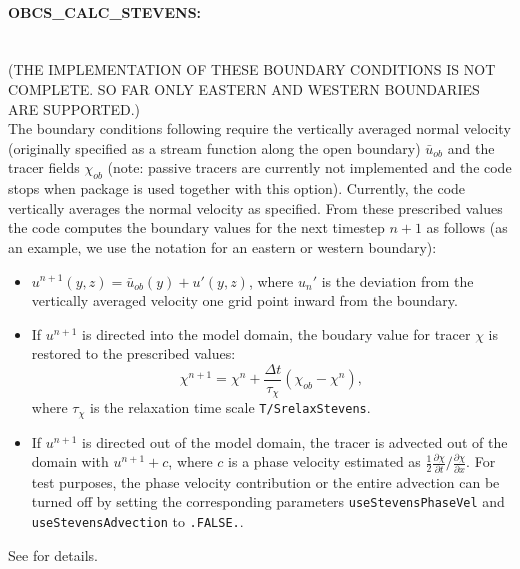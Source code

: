 \paragraph{OBCS\_CALC\_STEVENS:} ~ \\
(THE IMPLEMENTATION OF THESE BOUNDARY CONDITIONS IS NOT COMPLETE. SO
FAR ONLY EASTERN AND WESTERN BOUNDARIES ARE SUPPORTED.) \\
The boundary conditions following \citet{stevens:90} require the
vertically averaged normal velocity (originally specified as a stream
function along the open boundary) $\bar{u}_{ob}$ and the tracer fields
$\chi_{ob}$ (note: passive tracers are currently not implemented and
the code stops when package  is used together with this
option). Currently, the code vertically averages the normal velocity
as specified. From these prescribed values the code computes the
boundary values for the next timestep $n+1$ as follows (as an 
example, we use the notation for an eastern or western boundary):
\begin{itemize}
\item $u^{n+1}(y,z) = \bar{u}_{ob}(y) + u'(y,z)$, where $u_{n}'$ is the
  deviation from the vertically averaged velocity one grid point
  inward from the boundary.
\item If $u^{n+1}$ is directed into the model domain, the boudary
  value for tracer $\chi$ is restored to the prescribed values:
  \[\chi^{n+1} =   \chi^{n} + \frac{\Delta{t}}{\tau_\chi} (\chi_{ob} -
  \chi^{n}),\] where $\tau_\chi$ is the relaxation time
  scale \texttt{T/SrelaxStevens}.
\item If $u^{n+1}$ is directed out of the model domain, the tracer is
  advected out of the domain with $u^{n+1}+c$, where $c$ is a phase
  velocity estimated as
  $\frac{1}{2}\frac{\partial\chi}{\partial{t}}/\frac{\partial\chi}{\partial{x}}$.
  For test purposes, the phase velocity contribution or the entire
  advection can
  be turned off by setting the corresponding parameters
  \texttt{useStevensPhaseVel} and \texttt{useStevensAdvection} to
  \texttt{.FALSE.}.\end{itemize} See \citet{stevens:90} for details.

